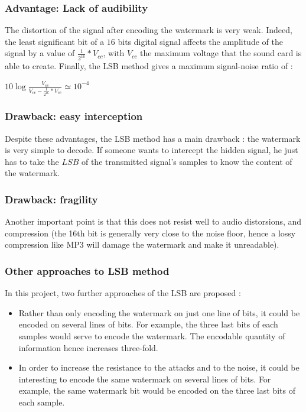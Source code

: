 \subsubsection{Advantage: Lack of audibility}
The distortion of the signal after encoding the watermark is very weak. Indeed, the least significant bit of a $16$ bits digital signal affects the amplitude of the signal by a value of $\displaystyle\frac{1}{2^{16}} * V_{cc}$\cite{kester2005data}, with $V_{cc}$ the maximum voltage that the sound card is able to create.
Finally, the LSB method gives a maximum signal-noise ratio of : 
 
\begin{center}
\begin{math}
10 \log \displaystyle\frac{V_{cc}}{V_{cc} - \displaystyle\frac{1}{2^{16}} * V_{cc}} \simeq 10^{-4}
\end{math}
\end{center}

\subsubsection{Drawback: easy interception}
Despite these advantages, the LSB method has a main drawback : the watermark is very simple to decode. If someone wants to intercept the hidden signal, he just has to take the $LSB$ of the transmitted signal's samples to know the content of the watermark.  

\subsubsection{Drawback: fragility}
Another important point is that this does not resist well to audio distorsions, and compression (the 16th bit is generally very close to the noise floor, hence a lossy compression like MP3 will damage the watermark and make it unreadable). 

\subsubsection{Other approaches to LSB method}
In this project, two further approaches of the LSB are proposed :
\begin{itemize}
\item Rather than only encoding the watermark on just one line of bits, it could be encoded on several lines of bits. For example, the three last bits of each samples would serve to encode the watermark. The encodable quantity of information hence increases three-fold.
\item In order to increase the resistance to the attacks and to the noise, it could be interesting to encode the same watermark on several lines of bits. For example, the same watermark bit would be encoded on the three last bits of each sample.
\end{itemize} 

